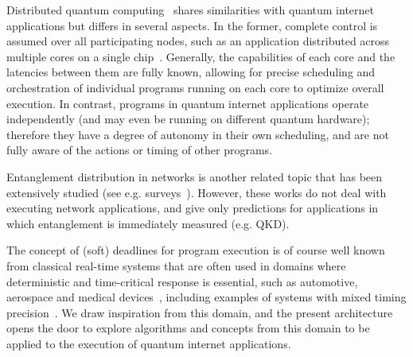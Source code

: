 Distributed quantum computing~\cite{cacciapuoti2019quantum} shares similarities with quantum internet applications but differs in several aspects.
In the former, complete control is assumed over all participating nodes, such as an application distributed across multiple cores on a single chip~\cite{ovide2023mapping, jnane2022multicore}.
Generally, the capabilities of each core and the latencies between them are fully known, allowing for precise scheduling and orchestration of individual programs running on each core to optimize overall execution.
In contrast, programs in quantum internet applications operate independently (and may even be running on different quantum hardware); therefore they have a degree of autonomy in their own scheduling, and are not fully aware of the actions or timing of other programs.

Entanglement distribution in networks is another related topic that has been extensively studied (see e.g. surveys~\cite{wei2022towards, azuma2021tools}).
However, these works do not deal with executing network applications, and give only predictions for applications in which entanglement is immediately measured (e.g. QKD).

The concept of (soft) deadlines for program execution is of course well known from classical real-time systems that are often used in domains where deterministic and time-critical response is essential, such as automotive, aerospace and medical devices~\cite{liu1973scheduling, hambarde2014survey, buttazzo2011hard}, including examples of systems with mixed timing precision~\cite{burns2017survey}.
We draw inspiration from this domain, and the present architecture opens the door to explore algorithms and concepts from this domain to be applied to the execution of quantum internet applications.
